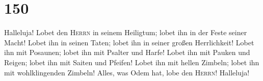 \hypertarget{section-149}{%
\section{150}\label{section-149}}

 Halleluja! Lobet den \textsc{Herrn} in seinem Heiligtum;
lobet ihn in der Feste seiner Macht!  Lobet ihn in seinen
Taten; lobet ihn in seiner großen Herrlichkeit!  Lobet ihn
mit Posaunen; lobet ihn mit Psalter und Harfe!  Lobet ihn
mit Pauken und Reigen; lobet ihn mit Saiten und Pfeifen! 
Lobet ihn mit hellen Zimbeln; lobet ihn mit wohlklingenden Zimbeln!
 Alles, was Odem hat, lobe den \textsc{Herrn}! Halleluja!
